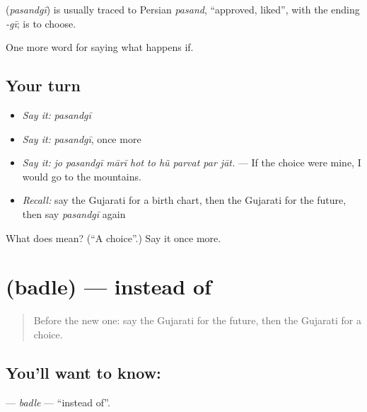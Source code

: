 \begin{cousinweb}
\textbf{} (\emph{pasandgī}) is usually traced to Persian \emph{pasand}, \textquotedblleft{}approved, liked\textquotedblright{}, with the ending \emph{-gī}; \textbf{ } is to choose.
\end{cousinweb}

\begin{grammarlens}[title={What you've built}]
One more word for saying what happens if.
\end{grammarlens}

\subsection*{Your turn}
\begin{itemize}
\raggedright
  \item \emph{Say it:} \emph{pasandgī}
  \item \emph{Say it:} \emph{pasandgī}, once more
  \item \emph{Say it:} \emph{jo pasandgī mārī hot to hũ parvat par jāt.} — If the choice were mine, I would go to the mountains.
  \item \emph{Recall:} say the Gujarati for a birth chart, then the Gujarati for the future, then say \emph{pasandgī} again
\end{itemize}

\begin{tcolorbox}[breakable,colback=teal!4,colframe=teal!35!black,title={Before you move on}]
What does  mean? (\textquotedblleft{}A choice\textquotedblright{}.) Say it once more.
\end{tcolorbox}
\section[\texorpdfstring{\gu{બદલે} (badle)}{બદલે (badle)}]{ (badle) — instead of}

\label{lesson:GU-C537-badle}



\begin{quote}
Before the new one: say the Gujarati for the future, then the Gujarati for a choice.
\end{quote}

\subsection*{You'll want to know: }
\textbf{} — \emph{badle} — \textquotedblleft{}instead of\textquotedblright{}.


